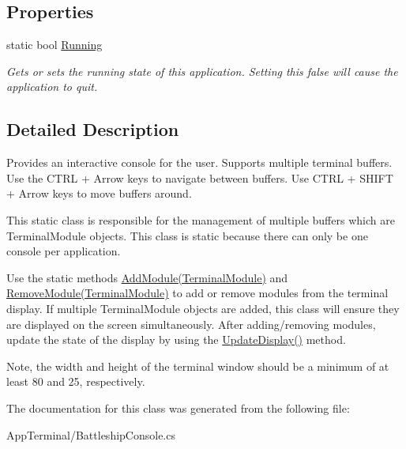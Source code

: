 \subsection*{Properties}
\begin{DoxyCompactItemize}
\item 
\hypertarget{class_m_b_c_1_1_app_1_1_terminal_1_1_battleship_console_a9315288f6855e9f29b87e38232ef6b71}{static bool \hyperlink{class_m_b_c_1_1_app_1_1_terminal_1_1_battleship_console_a9315288f6855e9f29b87e38232ef6b71}{Running}}\label{class_m_b_c_1_1_app_1_1_terminal_1_1_battleship_console_a9315288f6855e9f29b87e38232ef6b71}

\begin{DoxyCompactList}\small\item\em Gets or sets the running state of this application. Setting this false will cause the application to quit.\end{DoxyCompactList}\end{DoxyCompactItemize}


\subsection{Detailed Description}
Provides an interactive console for the user. Supports multiple terminal buffers. Use the C\-T\-R\-L + Arrow keys to navigate between buffers. Use C\-T\-R\-L + S\-H\-I\-F\-T + Arrow keys to move buffers around. 

This static class is responsible for the management of multiple buffers which are Terminal\-Module objects. This class is static because there can only be one console per application.

Use the static methods \hyperlink{class_m_b_c_1_1_app_1_1_terminal_1_1_battleship_console_a8f7f39ffe8ab6972e283ab2f034c0d7f}{Add\-Module(\-Terminal\-Module)} and \hyperlink{class_m_b_c_1_1_app_1_1_terminal_1_1_battleship_console_a77de210e288a093409e51a6420699778}{Remove\-Module(\-Terminal\-Module)} to add or remove modules from the terminal display. If multiple Terminal\-Module objects are added, this class will ensure they are displayed on the screen simultaneously. After adding/removing modules, update the state of the display by using the \hyperlink{class_m_b_c_1_1_app_1_1_terminal_1_1_battleship_console_a84106eecb3e7447bd0787cd960357a7f}{Update\-Display()} method.

Note, the width and height of the terminal window should be a minimum of at least 80 and 25, respectively. 

The documentation for this class was generated from the following file\-:\begin{DoxyCompactItemize}
\item 
App\-Terminal/Battleship\-Console.\-cs\end{DoxyCompactItemize}
